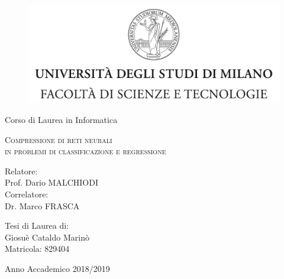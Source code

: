 \documentclass[11pt,a4paper,twoside,
openright]{book}
\begin{document}
\begin{titlepage}
	
	\begin{figure}
		\centering
		\includegraphics[width=424pt]{tesiSCIENZE_TECNOLOGIE.jpg}%
		\vspace{0.5 cm}
	\end{figure}
	

\begin{center}
{\LARGE Corso di Laurea in Informatica}
\end{center}

\begin{center}
\vspace{3 cm}
{\Large \textsc{Compressione di reti neurali \\ in problemi  di classificazione e regressione} }
\end{center}
\par
  \vspace{3 cm}
  
  \begin{flushleft}
  		 Relatore:\\Prof. Dario MALCHIODI\\
		 
  		 \noindent Correlatore:\\Dr. Marco FRASCA
  \end{flushleft}
  \vspace{1 cm}
  \begin{flushright}
  	Tesi di Laurea di:\\ Giosuè Cataldo Marinò\\ Matricola: 829404
  \end{flushright}
    	  
\vfill
\begin{center}
	{\large Anno Accademico 2018/2019}
\end{center}

\end{titlepage}
\end{document}
